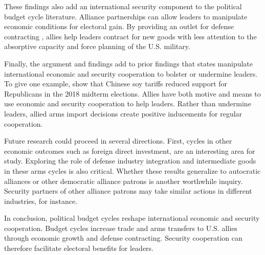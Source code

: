 \documentclass[12pt]{article}
\begin{document}
These findings also add an international security component to the political budget cycle literature.
Alliance partnerships can allow leaders to manipulate economic conditions for electoral gain. 
By providing an outlet for defense contracting , allies help leaders contract for new goods with less attention to the absorptive capacity and force planning of the U.S. military.


Finally, the argument and findings add to prior findings that states manipulate international economic and security cooperation to bolster or undermine leaders. 
To give one example, \citet{ChyzhUrbatsch2021} show that Chinese soy tariffs reduced support for Republicans in the 2018 midterm elections. 
Allies have both motive and means to use economic and security cooperation to help leaders. 
Rather than undermine leaders, allied arms import decisions create positive inducements for regular cooperation.


Future research could proceed in several directions. 
First, cycles in other economic outcomes such as foreign direct investment, are an interesting area for study. 
Exploring the role of defense industry integration and intermediate goods in these arms cycles is also critical.
Whether these results generalize to autocratic alliances or other democratic alliance patrons is another worthwhile inquiry. 
Security partners of other alliance patrons may take similar actions in different industries, for instance.


In conclusion, political budget cycles reshape international economic and security cooperation.
Budget cycles increase trade and arms transfers to U.S. allies through economic growth and defense contracting.
Security cooperation can therefore facilitate electoral benefits for leaders. 


\newpage
\singlespace
 
 
\end{document}
